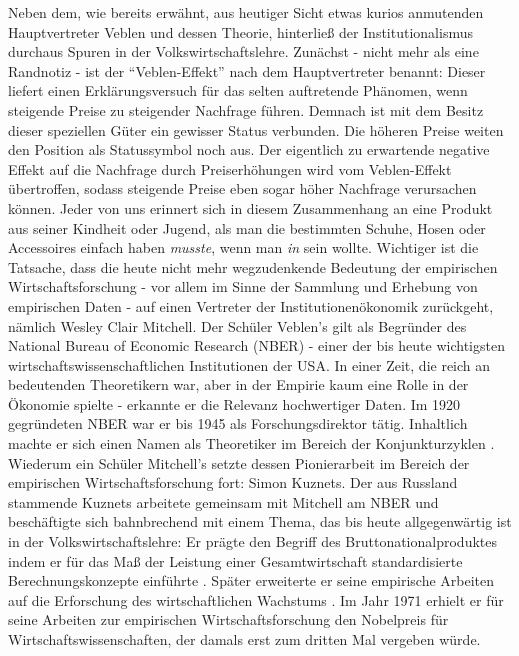 Neben dem, wie bereits erwähnt, aus heutiger Sicht etwas kurios anmutenden Hauptvertreter Veblen und dessen Theorie, hinterließ der Institutionalismus durchaus Spuren in der Volkswirtschaftslehre. Zunächst - nicht mehr als eine Randnotiz - ist der "`Veblen-Effekt"' nach dem Hauptvertreter benannt: Dieser liefert einen Erklärungsversuch für das selten auftretende Phänomen, wenn steigende Preise zu steigender Nachfrage führen. Demnach ist mit dem Besitz dieser speziellen Güter ein gewisser Status verbunden. Die höheren Preise weiten den Position als Statussymbol noch aus. Der eigentlich zu erwartende negative Effekt auf die Nachfrage durch Preiserhöhungen wird vom Veblen-Effekt übertroffen, sodass steigende Preise eben sogar höher Nachfrage verursachen können. Jeder von uns erinnert sich in diesem Zusammenhang an eine Produkt aus seiner Kindheit oder Jugend, als man die bestimmten Schuhe, Hosen oder Accessoires einfach haben \textit{musste}, wenn man \textit{in} sein wollte.
Wichtiger ist die Tatsache, dass die heute nicht mehr wegzudenkende Bedeutung der empirischen Wirtschaftsforschung - vor allem im Sinne der Sammlung und Erhebung von empirischen Daten - auf einen Vertreter der Institutionenökonomik zurückgeht, nämlich Wesley Clair Mitchell. Der Schüler Veblen's gilt als Begründer des National Bureau of Economic Research (NBER) - einer der bis heute wichtigsten wirtschaftswissenschaftlichen Institutionen der USA. In einer Zeit, die reich an bedeutenden Theoretikern war, aber in der Empirie kaum eine Rolle in der Ökonomie spielte - erkannte er die Relevanz hochwertiger Daten. Im 1920 gegründeten NBER war er bis 1945 als Forschungsdirektor tätig. Inhaltlich machte er sich einen Namen als Theoretiker im Bereich der Konjunkturzyklen \parencite{Mitchell1913, Mitchell1946}. Wiederum ein Schüler Mitchell's setzte dessen Pionierarbeit im Bereich der empirischen Wirtschaftsforschung fort: Simon Kuznets. Der aus Russland stammende Kuznets arbeitete gemeinsam mit Mitchell am NBER und beschäftigte sich bahnbrechend mit einem Thema, das bis heute allgegenwärtig ist in der Volkswirtschaftslehre: Er prägte den Begriff des Bruttonationalproduktes \parencite{Kuznets1937} indem er für das Maß der Leistung einer Gesamtwirtschaft standardisierte Berechnungskonzepte einführte \parencite{Nobelpreis-Komitee1971}. Später erweiterte er seine empirische Arbeiten auf die Erforschung des wirtschaftlichen Wachstums \parencite{Kuznets1967}. Im Jahr 1971 erhielt er für seine Arbeiten zur empirischen Wirtschaftsforschung den Nobelpreis für Wirtschaftswissenschaften, der damals erst zum dritten Mal vergeben würde. 

